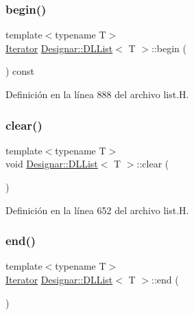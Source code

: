 \subsubsection{\texorpdfstring{begin()}{begin()}\hspace{0.1cm}{\footnotesize\ttfamily [2/2]}}
{\footnotesize\ttfamily template$<$typename T$>$ \\
\hyperlink{class_designar_1_1_d_l_list_1_1_iterator}{Iterator} \hyperlink{class_designar_1_1_d_l_list}{Designar\+::\+D\+L\+List}$<$ T $>$\+::begin (\begin{DoxyParamCaption}{ }\end{DoxyParamCaption}) const\hspace{0.3cm}{\ttfamily [inline]}}



Definición en la línea 888 del archivo list.\+H.

\mbox{\label{class_designar_1_1_d_l_list_a0b617ee4b2f03b58b74630f79566f1b8}} 
\subsubsection{\texorpdfstring{clear()}{clear()}}
{\footnotesize\ttfamily template$<$typename T$>$ \\
void \hyperlink{class_designar_1_1_d_l_list}{Designar\+::\+D\+L\+List}$<$ T $>$\+::clear (\begin{DoxyParamCaption}{ }\end{DoxyParamCaption})\hspace{0.3cm}{\ttfamily [inline]}}



Definición en la línea 652 del archivo list.\+H.

\mbox{\label{class_designar_1_1_d_l_list_afa49470cd57bc800bfa95c00cebb4c08}} 
\subsubsection{\texorpdfstring{end()}{end()}\hspace{0.1cm}{\footnotesize\ttfamily [1/2]}}
{\footnotesize\ttfamily template$<$typename T$>$ \\
\hyperlink{class_designar_1_1_d_l_list_1_1_iterator}{Iterator} \hyperlink{class_designar_1_1_d_l_list}{Designar\+::\+D\+L\+List}$<$ T $>$\+::end (\begin{DoxyParamCaption}{ }\end{DoxyParamCaption})\hspace{0.3cm}{\ttfamily [inline]}}



